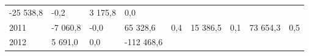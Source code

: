 \begin{longtable}[]{@{}lllllllll@{}}
\begin{minipage}[t]{0.12\columnwidth}
-25 538,8\strut
\end{minipage} & \begin{minipage}[t]{0.06\columnwidth}\raggedright
-0,2\strut
\end{minipage} & \begin{minipage}[t]{0.09\columnwidth}\raggedright
3 175,8\strut
\end{minipage} & \begin{minipage}[t]{0.06\columnwidth}\raggedright
0,0\strut
\end{minipage}\tabularnewline
\begin{minipage}[t]{0.05\columnwidth}\raggedright
2011\strut
\end{minipage} & \begin{minipage}[t]{0.10\columnwidth}\raggedright
-7 060,8\strut
\end{minipage} & \begin{minipage}[t]{0.06\columnwidth}\raggedright
-0,0\strut
\end{minipage} & \begin{minipage}[t]{0.16\columnwidth}\raggedright
65 328,6\strut
\end{minipage} & \begin{minipage}[t]{0.06\columnwidth}\raggedright
0,4\strut
\end{minipage} & \begin{minipage}[t]{0.12\columnwidth}\raggedright
15 386,5\strut
\end{minipage} & \begin{minipage}[t]{0.06\columnwidth}\raggedright
0,1\strut
\end{minipage} & \begin{minipage}[t]{0.09\columnwidth}\raggedright
73 654,3\strut
\end{minipage} & \begin{minipage}[t]{0.06\columnwidth}\raggedright
0,5\strut
\end{minipage}\tabularnewline
\begin{minipage}[t]{0.05\columnwidth}\raggedright
2012\strut
\end{minipage} & \begin{minipage}[t]{0.10\columnwidth}\raggedright
5 691,0\strut
\end{minipage} & \begin{minipage}[t]{0.06\columnwidth}\raggedright
0,0\strut
\end{minipage} & \begin{minipage}[t]{0.16\columnwidth}\raggedright
-112 468,6\strut
\end{minipage} & \begin{minipage}[t]{0.06\columnwidth}\raggedright

\end{minipage}
\end{longtable}
